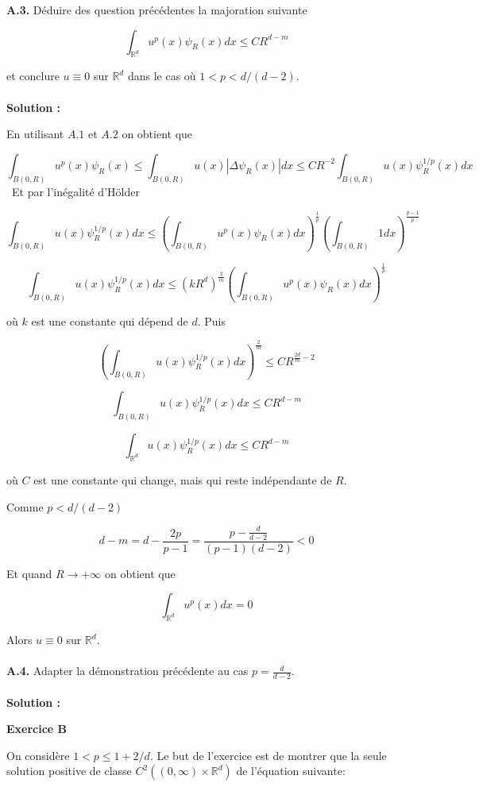 \documentclass[10pt,a4paper,oneside]{article}
\begin{document}
\textbf{A.3.} Déduire des question précédentes la majoration suivante

\[ \int_{\mathbb{R}^d} u^p(x) \psi_R(x) dx \leq CR^{d - m} \]

et conclure $u \equiv 0$ sur $\mathbb{R}^d$ dans le cas où $1 < p < d / (d - 2)$.
\\ \\
\textbf{Solution :}

En utilisant $A.1$ et $A.2$ on obtient que

\[ \int_{B(0,R)} u^p(x) \psi_R(x) \leq \int_{B(0,R)} u(x) |\Delta \psi_R(x)| dx \leq CR^{-2} \int_{B(0,R)} u(x) \psi_R^{1 / p}(x) dx \]
\
Et par l'inégalité d'Hölder

\[ \int_{B(0,R)} u(x) \psi_R^{1 / p}(x) dx \leq \left(\int_{B(0,R)} u^p(x) \psi_R(x) dx\right)^{\frac{1}{p}} \left(\int_{B(0,R)} 1dx\right)^{\frac{p - 1}{p}} \]

\[ \int_{B(0,R)} u(x) \psi_R^{1 / p}(x) dx \leq (kR^d)^{\frac{2}{m}} \left(\int_{B(0,R)} u^p(x) \psi_R(x) dx\right)^{\frac{1}{p}} \]

où $k$ est une constante qui dépend de $d$. Puis

\[ \left( \int_{B(0,R)} u(x) \psi_R^{1 / p}(x) dx \right)^{\frac{2}{m}} \leq CR^{\frac{2d}{m} - 2} \]

\[ \int_{B(0,R)} u(x) \psi_R^{1 / p}(x) dx \leq CR^{d - m} \]

\[ \boxed{ \int_{\mathbb{R}^d} u(x) \psi_R^{1 / p}(x) dx \leq CR^{d - m} } \]

où $C$ est une constante qui change, mais qui reste indépendante de $R$.

Comme $p < d / (d - 2)$

\[ d - m = d - \frac{2p}{p - 1} = \frac{p - \frac{d}{d - 2}}{(p - 1)(d - 2)} < 0 \]

Et quand $R \to +\infty$ on obtient que

\[ \int_{\mathbb{R}^d} u^p(x) dx = 0 \]

Alors $u \equiv 0$ sur $\mathbb{R}^d$.
\\ \\
\textbf{A.4.} Adapter la démonstration précédente au cas $p = \frac{d}{d - 2}$.
\\ \\
\textbf{Solution :}

\begin{center}
\textbf{Exercice B}
\end{center}

On considère $1 < p \leq 1 + 2 / d$. Le but de l'exercice est de montrer que la seule solution positive de classe $C^2((0, \infty) \times \mathbb{R}^d)$ de l'équation suivante:
\end{document}
